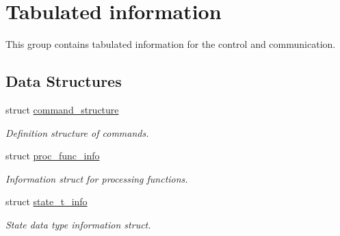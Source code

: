 \hypertarget{group__control__tables}{
\section{\-Tabulated information}
\label{group__control__tables}
}


\-This group contains tabulated information for the control and communication.  


\subsection*{\-Data \-Structures}
\begin{DoxyCompactItemize}
\item 
struct \hyperlink{structcommand__structure}{command\-\_\-structure}
\begin{DoxyCompactList}\small\item\em \-Definition structure of commands. \end{DoxyCompactList}\item 
struct \hyperlink{structproc__func__info}{proc\-\_\-func\-\_\-info}
\begin{DoxyCompactList}\small\item\em \-Information struct for processing functions. \end{DoxyCompactList}\item 
struct \hyperlink{structstate__t__info}{state\-\_\-t\-\_\-info}
\begin{DoxyCompactList}\small\item\em \-State data type information struct. \end{DoxyCompactList}\end{DoxyCompactItemize}
